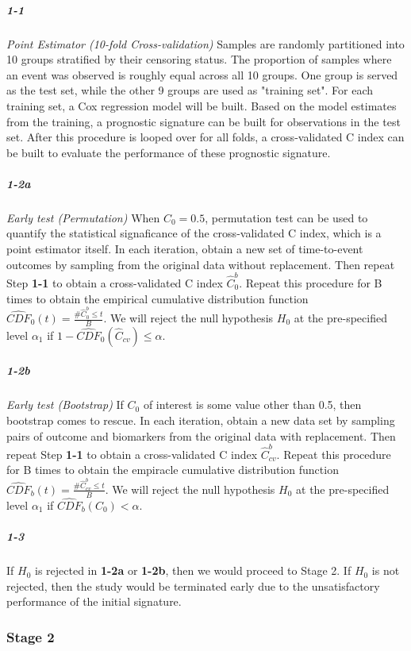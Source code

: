 \documentclass[11pt]{article}
\begin{document}
		\subparagraph{1-1} \textit{Point Estimator (10-fold Cross-validation)} Samples are randomly partitioned into 10 groups stratified by their censoring status. The proportion of samples where an event was observed is roughly equal across all 10 groups. One group is served as the test set, while the other 9 groups are used as "training set". For each training set, a Cox regression model will be built. Based on the model estimates from the training, a prognostic signature can be built for observations in the test set. After this procedure is looped over for all folds, a cross-validated C index can be built to evaluate the performance of these prognostic signature.

		\subparagraph{1-2a} \textit{Early test (Permutation)} When $C_0 = 0.5$, permutation test can be used to quantify the statistical signaficance of the cross-validated C index, which is a point estimator itself. In each iteration, obtain a new set of time-to-event outcomes by sampling from the original data without replacement. Then repeat Step \textbf{1-1} to obtain a cross-validated C index $\hat{C}_{0}^{b}$. Repeat this procedure for B times to obtain the empirical cumulative distribution function $\widehat{CDF}_{0}(t) =  \frac{\# \hat{C}_{0}^{b} \leq t}{B}$. We will reject the null hypothesis $H_0$ at the pre-specified level $\alpha_1$ if $ 1 - \widehat{CDF}_{0}(\hat{C}_{cv}) \leq \alpha$.
	
		\subparagraph{1-2b} \textit{Early test (Bootstrap)} If $C_0$ of interest is some value other than 0.5, then bootstrap comes to rescue. In each iteration, obtain a new data set by sampling pairs of outcome and biomarkers from the original data with replacement. Then repeat Step \textbf{1-1} to obtain a cross-validated C index $\hat{C}_{cv}^{b}$. Repeat this procedure for B times to obtain the empiracle cumulative distribution function $\widehat{CDF}_{b}(t) =  \frac{\# \hat{C}_{cv}^{b} \leq t}{B}$. We will reject the null hypothesis $H_0$ at the pre-specified level $\alpha_1$ if $\widehat{CDF}_{b}(C_{0}) < \alpha$.

		\subparagraph{1-3} If $H_0$ is rejected in \textbf{1-2a} or \textbf{1-2b}, then we would proceed to Stage 2. If $H_0$ is not rejected, then the study would be terminated early due to the unsatisfactory performance of the initial signature.

	\subsubsection*{Stage 2}
		
\end{document}

